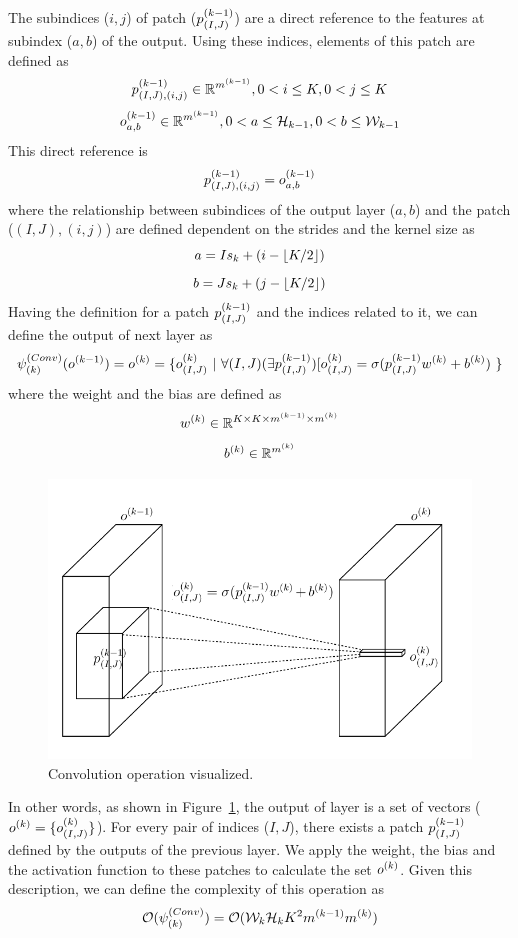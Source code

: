 The subindices ($i,j$) of patch ($\pki{k-1}{(I,J)}$) are a direct reference to the features at subindex ($a,b$) of the output. Using these indices, elements of this patch are defined as
$$ \pki{k-1}{(I,J),(i,j)} \inreal{\mk{k-1}} , 0 < i \leq \kernelsize, 0 < j \leq \kernelsize$$
$$ \oki{k-1}{a,b} \inreal{\mk{k-1}} , 0 < a \leq \heightk{k-1}, 0 < b \leq  \widthk{k-1} $$
This direct reference is
$$ \pki{k-1}{(I,J),(i,j)} = \oki{k-1}{a,b} $$
where the relationship between subindices of the output layer ($a,b$) and the patch ($(I,J),(i,j)$) are defined dependent on the strides and the kernel size as
$$ a = I\sk{k} + (i - \floor*{\kernelsize/2}) $$
$$ b = J\sk{k} + (j - \floor*{\kernelsize/2}) $$
Having the definition for a patch $\pki{k-1}{(I,J)}$ and the indices related to it, we can define the output of next layer as
$$\convk{k}(\ok{k-1}) = \ok{k} = \{\oki{k}{(I,J)} \ | \ \forall (I,J) (\exists \pki{k-1}{(I,J)}) [ \oki{k}{(I,J)} = \sigma(\pki{k-1}{(I,J)} \wk{k} + \bk{k})\ \}  $$
where the weight and the bias are defined as
$$ \wk{k} \inreal{\kernelsize \times \kernelsize \times \mk{k-1} \times \mk{k}} $$
$$ \bk{k} \inreal{\mk{k}}$$
\begin{figure}[!h]
  \begin{centering}
    \includegraphics[width=1\textwidth]{images/convolution.pdf}
    \caption{Convolution operation visualized. }
    \label{fig:convolution}
  \end{centering}
\end{figure}
In other words, as shown in Figure~\ref{fig:convolution}, the output of layer is a set of vectors ($\ok{k} = \{\oki{k}{(I,J)}\}$). For every pair of indices ($I,J$), there exists a patch $\pki{k-1}{(I,J)}$ defined by the outputs of the previous layer. We apply the weight, the bias and the activation function to these patches to calculate the set $\ok{k}$. Given this description, we can define the complexity of this operation as
$$ \bigo{\convk{k}} = \bigo{\widthk{k}\heightk{k}\kernelsize^2\mk{k-1}\mk{k}} $$




